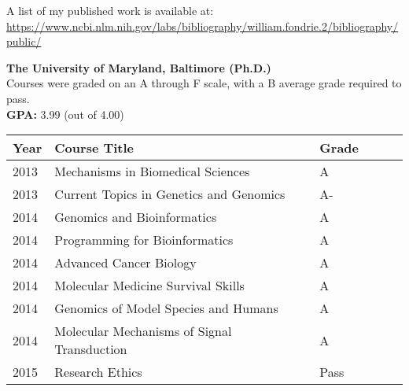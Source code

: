 \documentclass[11pt]{article}
\newcommand{\mysection}[1]{\vspace{1ex}{\bf #1} \vspace*{0.3ex}}
\begin{document}
A list of my published work is available at: \\
\url{https://www.ncbi.nlm.nih.gov/labs/bibliography/william.fondrie.2/bibliography/public/}

\mysection{D. Research Support and Scholastic Performance}

{\bf The University of Maryland, Baltimore (Ph.D.)} \\
Courses were graded on an A through F scale, with a B average grade required to pass. \\
{\bf GPA:} 3.99 (out of 4.00) \\

\begin{tabular}{llllll}
  \hline
  Year & Course Title                                & Grade \\
  \hline
  2013 & Mechanisms in Biomedical Sciences           & A     \\
  2013 & Current Topics in Genetics and Genomics     & A-    \\
  2014 & Genomics and Bioinformatics                 & A     \\
  2014 & Programming for Bioinformatics              & A     \\
  2014 & Advanced Cancer Biology                     & A     \\
  2014 & Molecular Medicine Survival Skills          & A     \\
  2014 & Genomics of Model Species and Humans        & A     \\
  2014 & Molecular Mechanisms of Signal Transduction & A     \\
  2015 & Research Ethics                             & Pass  \\
  \hline
\end{tabular}

\setlength{\parskip}{1.2ex}

\newcommand{\firstcol}{3.5in}
\newcommand{\secondcol}{2.25in}
\newcommand{\thirdcol}{1.5in}
\newcommand{\allcols}{7.25in}
\end{document}
